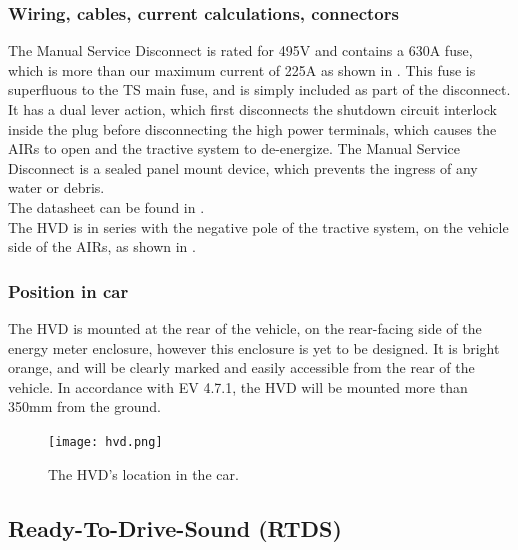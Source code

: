 \documentclass{article}
\begin{document}
\subsubsection{Wiring, cables, current calculations, connectors}
The Manual Service Disconnect is rated for 495V and contains a 630A fuse, which is more than our maximum current of 225A as shown in . This fuse is superfluous to the TS main fuse, and is simply included as part of the disconnect.  It has a dual lever action, which first disconnects the shutdown circuit interlock inside the plug before disconnecting the high power terminals, which causes the AIRs to open and the tractive system to de-energize. The Manual Service Disconnect is a sealed panel mount device, which prevents the ingress of any water or debris. \\

The datasheet can be found in .\\

The HVD is in series with the negative pole of the tractive system, on the vehicle side of the AIRs, as shown in . 

\subsubsection{Position in car}
The HVD is mounted at the rear of the vehicle, on the rear-facing side of the energy meter enclosure, however this enclosure is yet to be designed. It is bright orange, and will be clearly marked and easily accessible from the rear of the vehicle. In accordance with EV 4.7.1, the HVD will be mounted more than 350mm from the ground.  

\begin{figure}[h]
\centering
\texttt{[image: hvd.png]}
\caption{The HVD's location in the car.}
\label{fig:hvd}
\end{figure}


\subsection{Ready-To-Drive-Sound (RTDS)}\label{ready_to_drive_sound}
\end{document}
